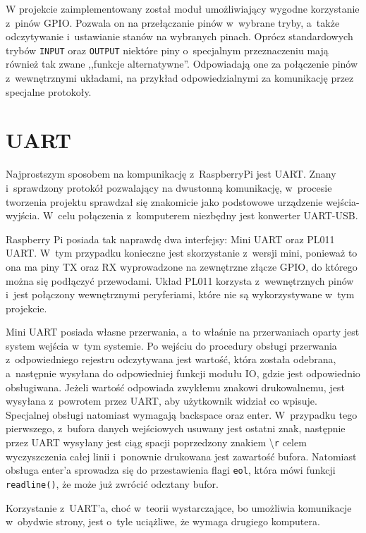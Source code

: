 \documentclass[shortabstract]{iithesis}
\begin{document}
W projekcie zaimplementowany został moduł umożliwiający wygodne korzystanie z~pinów GPIO. Pozwala on na przełączanie pinów w~wybrane tryby, a~także odczytywanie i~ustawianie stanów na wybranych pinach. Oprócz standardowych trybów \texttt{INPUT} oraz \texttt{OUTPUT} niektóre piny o~specjalnym przeznaczeniu mają również tak zwane ,,funkcje alternatywne''. Odpowiadają one za połączenie pinów z~wewnętrznymi układami, na przykład odpowiedzialnymi za komunikację przez specjalne protokoły.

\section{UART}
Najprostszym sposobem na kompunikację z~RaspberryPi jest UART. Znany i~sprawdzony protokół pozwalający na dwustonną komunikację, w~procesie tworzenia projektu sprawdzał się znakomicie jako podstowowe urządzenie wejścia-wyjścia. W~celu połączenia z~komputerem niezbędny jest konwerter UART-USB.

Raspberry Pi posiada tak naprawdę dwa interfejsy: Mini UART oraz PL011 UART. W~tym przypadku konieczne jest skorzystanie z~wersji mini, ponieważ to ona ma piny TX oraz RX wyprowadzone na zewnętrzne złącze GPIO, do którego można się podłączyć przewodami. Układ PL011 korzysta z~wewnętrznych pinów i~jest połączony wewnętrznymi peryferiami, które nie są wykorzystywane w~tym projekcie.

Mini UART posiada własne przerwania, a~to właśnie na przerwaniach oparty jest system wejścia w~tym systemie. Po wejściu do procedury obsługi przerwania z~odpowiedniego rejestru odczytywana jest wartość, która została odebrana, a~następnie wysyłana do odpowiedniej funkcji modułu IO, gdzie jest odpowiednio obsługiwana. Jeżeli wartość odpowiada zwykłemu znakowi drukowalnemu, jest wysyłana z~powrotem przez UART, aby użytkownik widział co wpisuje. Specjalnej obsługi natomiast wymagają backspace oraz enter. W~przypadku tego pierwszego, z~bufora danych wejściowych usuwany jest ostatni znak, następnie przez UART wysyłany jest ciąg spacji poprzedzony znakiem \textbackslash \texttt{r} celem wyczyszczenia całej linii i~ponownie drukowana jest zawartość bufora. Natomiast obsługa enter'a sprowadza się do przestawienia flagi \texttt{eol}, która mówi funkcji \texttt{readline()}, że może już zwrócić odcztany bufor.

Korzystanie z~UART'a, choć w~teorii wystarczające, bo umożliwia komunikacje w~obydwie strony, jest o~tyle uciążliwe, że wymaga drugiego komputera.
\end{document}
